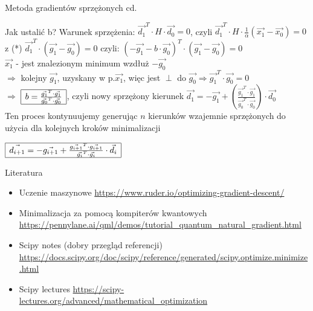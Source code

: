   \begin{frame}{Metoda gradientów sprzężonych cd. }

   \begin{block}{Jak ustalić b?}
	  Warunek sprzężenia: $\vec{d_1}^T \cdot H \cdot \vec{d_0}  = 0$,
	  czyli $\vec{d_1}^T \cdot H \cdot \frac{1}{\alpha}(\vec{x_1}-\vec{x_0}) = 0$
	  z (*) $\vec{d_1}^T  \cdot (\vec{g_1} - \vec{g_0})=0$ czyli:
  $
 (-\vec{g_1} -b \cdot \vec{g_0})^T \cdot (\vec{g_1} - \vec{g_0}) = 0$
	  \\$\vec{x_1}$ - jest znalezionym minimum wzdłuż $-\vec{g_0}$\\ $\Rightarrow$
	  kolejny $\vec{g_1}$, uzyskany w p.$\vec{x_1}$, więc jest $\perp$ do $\vec{g_0}  \Rightarrow  \vec{g_1}^T \cdot \vec{g_0} = 0$
	  \smallskip
	  \\$\Rightarrow$
	  $\begin{array}{|c|}
 	   	 \hline
 	   	    b = \frac{\vec{g_1}^T \cdot \vec{g_1}}{\vec{g_0}^T \cdot \vec{g_0}}
 	   	 \\ \hline
	  \end{array}$,
 	  czyli nowy sprzężony kierunek $\vec{d_1} = -\vec{g_1} + \left(\frac{\vec{g_1}^T \cdot \vec{g_1}}{\vec{g_0}^T \cdot \vec{g_0}}\right) \cdot \vec{d_0} $
 	  \medskip
 	  \\Ten proces kontynuujemy generując $n$ kierunków  wzajemnie sprzężonych do użycia dla kolejnych kroków minimalizacji 
 	  \begin{center}
 	  	 $\begin{array}{|c|}
 	   	   \hline
 	   	      \vec{d_{i+1}} = -\vec{g_{i+1}} + \frac{\vec{g_{i+1}}^T \cdot \vec{g_{i+1}}}{\vec{g_{i}}^T \cdot \vec{g_{i}}} \cdot \vec{d_i}
 	   	   \\ \hline
	    \end{array}$
 	  \end{center}
 	
 	\end{block}

  \end{frame}
  \begin{frame}{Literatura}
  \begin{itemize}
  \item Uczenie maszynowe
  \url{https://www.ruder.io/optimizing-gradient-descent/}
     \item Minimalizacja za pomocą kompiterów kwantowych \url{https://pennylane.ai/qml/demos/tutorial_quantum_natural_gradient.html}
     \item Scipy notes (dobry przegląd referencji) \url{https://docs.scipy.org/doc/scipy/reference/generated/scipy.optimize.minimize.html}
     \item Scipy lectures \url{https://scipy-lectures.org/advanced/mathematical_optimization}
  \end{itemize}
  \end{frame}
